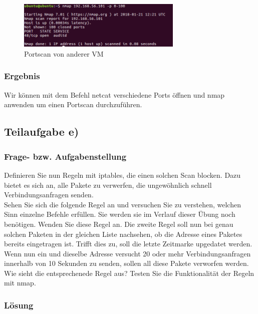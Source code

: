 \begin{figure}[htbp]
\begin{center}
\includegraphics[width=0.7\textwidth]{Bild3}
\caption{Portscan von anderer VM}
\label{fig:Portscan2}
\end{center}
\end{figure}

\newpage

\subsubsection{Ergebnis}

Wir können mit dem Befehl netcat verschiedene Ports öffnen und nmap anwenden um einen Portscan durchzuführen.

\subsection{Teilaufgabe e)} \cite{4}

\subsubsection{Frage- bzw. Aufgabenstellung}

Definieren Sie nun Regeln mit iptables, die einen solchen Scan blocken. Dazu bietet es sich an, alle Pakete zu verwerfen, die ungewöhnlich schnell Verbindungsanfragen senden. \\
Sehen Sie sich die folgende Regel an und versuchen Sie zu verstehen, welchen Sinn einzelne Befehle erfüllen. Sie werden sie im Verlauf dieser Übung noch benötigen. Wenden Sie diese Regel an. Die zweite Regel soll nun bei genau solchen Paketen in der gleichen Liste nachsehen, ob die Adresse eines Paketes bereits eingetragen ist. Trifft dies zu, soll die letzte Zeitmarke upgedatet werden. Wenn nun ein und dieselbe Adresse versucht 20 oder mehr Verbindungsanfragen innerhalb von 10 Sekunden zu senden, sollen all diese Pakete verworfen werden. Wie sieht die entsprechenede Regel aus? Testen Sie die Funktionalität der Regeln mit nmap.

\subsubsection{Lösung}


